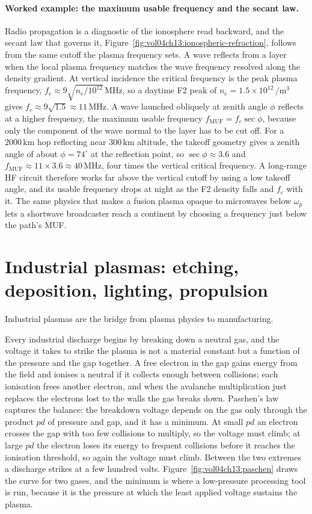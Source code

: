 \paragraph{Worked example: the maximum usable frequency and the secant law.}
Radio propagation is a diagnostic of the ionosphere read backward, and the
secant law that governs it, Figure~\ref{fig:vol04ch13:ionospheric-refraction},
follows from the same cutoff the plasma frequency sets. A wave reflects from a
layer when the local plasma frequency matches the wave frequency resolved along
the density gradient. At vertical incidence the critical frequency is the peak
plasma frequency, $f_c \approx 9\sqrt{n_e/10^{12}}\,\si{\mega\hertz}$, so a
daytime F2 peak of $n_e = 1.5\times 10^{12}\,\si{\per\meter\cubed}$ gives $f_c
\approx 9\sqrt{1.5} \approx 11\,\si{\mega\hertz}$. A wave launched obliquely at
zenith angle $\phi$ reflects at a higher frequency, the maximum usable
frequency $f_{\mathrm{MUF}} = f_c\sec\phi$, because only the component of the
wave normal to the layer has to be cut off. For a $2000\,\si{\kilo\meter}$ hop
reflecting near $300\,\si{\kilo\meter}$ altitude, the takeoff geometry gives a
zenith angle of about $\phi = 74^{\circ}$ at the reflection point, so $\sec\phi
\approx 3.6$ and $f_{\mathrm{MUF}} \approx 11\times 3.6 \approx 40\,\si{\mega
\hertz}$, four times the vertical critical frequency. A long-range HF circuit
therefore works far above the vertical cutoff by using a low takeoff angle, and
its usable frequency drops at night as the F2 density falls and $f_c$ with it.
The same physics that makes a fusion plasma opaque to microwaves below $\omega_p$
lets a shortwave broadcaster reach a continent by choosing a frequency just
below the path's MUF.

\section{Industrial plasmas: etching, deposition, lighting, propulsion}

Industrial plasmas are the bridge from plasma physics to
manufacturing.

Every industrial discharge begins by breaking down a neutral gas, and the
voltage it takes to strike the plasma is not a material constant but a
function of the pressure and the gap together. A free electron in the gap
gains energy from the field and ionises a neutral if it collects enough
between collisions; each ionisation frees another electron, and when the
avalanche multiplication just replaces the electrons lost to the walls the gas
breaks down. Paschen's law captures the balance: the breakdown voltage depends
on the gas only through the product $pd$ of pressure and gap, and it has a
minimum. At small $pd$ an electron crosses the gap with too few collisions to
multiply, so the voltage must climb; at large $pd$ the electron loses its
energy to frequent collisions before it reaches the ionisation threshold, so
again the voltage must climb. Between the two extremes a discharge strikes at
a few hundred volts. Figure~\ref{fig:vol04ch13:paschen} draws the curve for
two gases, and the minimum is where a low-pressure processing tool is run,
because it is the pressure at which the least applied voltage sustains the
plasma.

